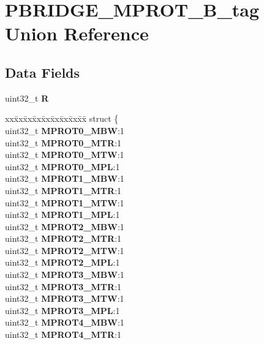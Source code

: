 \hypertarget{unionPBRIDGE__MPROT__32B__tag}{}\section{P\+B\+R\+I\+D\+G\+E\+\_\+\+M\+P\+R\+O\+T\+\_\+B\+\_\+tag Union Reference}
\label{unionPBRIDGE__MPROT__32B__tag}
\subsection*{Data Fields}
\begin{DoxyCompactItemize}
\item 
\mbox{\label{unionPBRIDGE__MPROT__32B__tag_a9ca15a46ab1621c60403be2653e7b796}} 
uint32\+\_\+t {\bfseries R}
\item 
\mbox{\label{unionPBRIDGE__MPROT__32B__tag_acd6d200b1a7e83c5ba6ce76fe251c055}} 
\begin{tabbing}
xx\=xx\=xx\=xx\=xx\=xx\=xx\=xx\=xx\=\kill
struct \{\\
\>uint32\_t {\bfseries MPROT0\_MBW}:1\\
\>uint32\_t {\bfseries MPROT0\_MTR}:1\\
\>uint32\_t {\bfseries MPROT0\_MTW}:1\\
\>uint32\_t {\bfseries MPROT0\_MPL}:1\\
\>uint32\_t {\bfseries MPROT1\_MBW}:1\\
\>uint32\_t {\bfseries MPROT1\_MTR}:1\\
\>uint32\_t {\bfseries MPROT1\_MTW}:1\\
\>uint32\_t {\bfseries MPROT1\_MPL}:1\\
\>uint32\_t {\bfseries MPROT2\_MBW}:1\\
\>uint32\_t {\bfseries MPROT2\_MTR}:1\\
\>uint32\_t {\bfseries MPROT2\_MTW}:1\\
\>uint32\_t {\bfseries MPROT2\_MPL}:1\\
\>uint32\_t {\bfseries MPROT3\_MBW}:1\\
\>uint32\_t {\bfseries MPROT3\_MTR}:1\\
\>uint32\_t {\bfseries MPROT3\_MTW}:1\\
\>uint32\_t {\bfseries MPROT3\_MPL}:1\\
\>uint32\_t {\bfseries MPROT4\_MBW}:1\\
\>uint32\_t {\bfseries MPROT4\_MTR}:1\\

\end{tabbing}
\end{DoxyCompactItemize}

